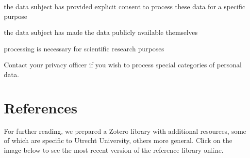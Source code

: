 \documentclass[
]{book}
\begin{document}
the data subject has provided explicit consent to process these data for a specific purpose

the data subject has made the data publicly available themselves

processing is necessary for scientific research purposes

Contact your privacy officer if you wish to process special categories of personal data.

\hypertarget{references}{%
\chapter{References}\label{references}}

For further reading, we prepared a Zotero library with additional resources, some
of which are specific to Utrecht University, others more general. Click on the
image below to see the most recent version of the reference library online.

  
\end{document}
